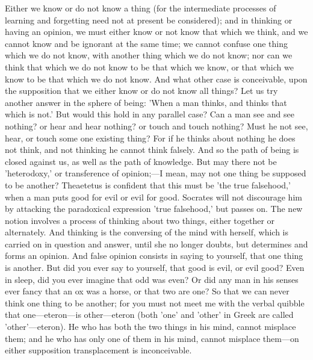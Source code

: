 \documentclass[11pt,letter]{article}
\begin{document}
\par  Either we know or do not know a thing (for the intermediate processes of learning and forgetting need not at present be considered); and in thinking or having an opinion, we must either know or not know that which we think, and we cannot know and be ignorant at the same time; we cannot confuse one thing which we do not know, with another thing which we do not know; nor can we think that which we do not know to be that which we know, or that which we know to be that which we do not know. And what other case is conceivable, upon the supposition that we either know or do not know all things? Let us try another answer in the sphere of being: 'When a man thinks, and thinks that which is not.' But would this hold in any parallel case? Can a man see and see nothing? or hear and hear nothing? or touch and touch nothing? Must he not see, hear, or touch some one existing thing? For if he thinks about nothing he does not think, and not thinking he cannot think falsely. And so the path of being is closed against us, as well as the path of knowledge. But may there not be 'heterodoxy,' or transference of opinion;—I mean, may not one thing be supposed to be another? Theaetetus is confident that this must be 'the true falsehood,' when a man puts good for evil or evil for good. Socrates will not discourage him by attacking the paradoxical expression 'true falsehood,' but passes on. The new notion involves a process of thinking about two things, either together or alternately. And thinking is the conversing of the mind with herself, which is carried on in question and answer, until she no longer doubts, but determines and forms an opinion. And false opinion consists in saying to yourself, that one thing is another. But did you ever say to yourself, that good is evil, or evil good? Even in sleep, did you ever imagine that odd was even? Or did any man in his senses ever fancy that an ox was a horse, or that two are one? So that we can never think one thing to be another; for you must not meet me with the verbal quibble that one—eteron—is other—eteron (both 'one' and 'other' in Greek are called 'other'—eteron). He who has both the two things in his mind, cannot misplace them; and he who has only one of them in his mind, cannot misplace them—on either supposition transplacement is inconceivable.
\end{document}
